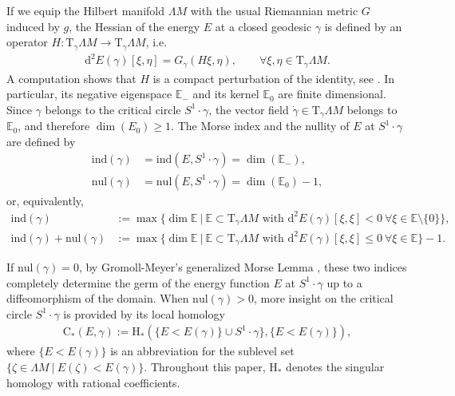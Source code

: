 \documentclass[reqno]{amsart}
\numberwithin{equation}{section}
\theoremstyle{personal}%
\theoremstyle{definition}
\newcommand{\E}{\mathds{E}}
\newcommand{\diff}{\mathrm{d}}
\newcommand{\Tan}{\mathrm{T}}
\newcommand{\Hom}{\mathrm{H}}
\newcommand{\Loc}{\mathrm{C}}
\newcommand{\ind}{\mathrm{ind}}
\newcommand{\nul}{\mathrm{nul}}
\begin{document}
If we equip the Hilbert manifold $\Lambda M$ with the usual Riemannian metric $G$ induced by $g$, the Hessian of the energy $E$ at a closed geodesic $\gamma$ is defined by an operator $H:\Tan_\gamma\Lambda M\to\Tan_\gamma\Lambda M$, i.e.
\begin{align*}
\diff^2E(\gamma)[\xi,\eta]
=
G_\gamma(H\xi,\eta),
\qquad
\forall \xi,\eta\in\Tan_\gamma\Lambda M.
\end{align*}
A computation shows that $H$ is a compact perturbation of the identity, see \cite[Lemma~3]{Gromoll:1969gh}. In particular, its negative eigenspace $\E_-$ and its kernel $\E_0$ are finite dimensional. Since $\gamma$ belongs to the critical circle $S^1\cdot\gamma$, the vector field $\dot\gamma\in\Tan_{\gamma}\Lambda M$ belongs to $\E_0$, and therefore $\dim(E_0)\geq1$. The Morse index and the nullity of $E$ at $S^1\cdot\gamma$ are defined by
\begin{align*}
\ind(\gamma) & =\ind(E,S^1\cdot\gamma)=\dim(\E_-),\\
\nul(\gamma) & =\nul(E,S^1\cdot\gamma)=\dim(\E_0)-1,
\end{align*}
or, equivalently,
\begin{align*}
\ind(\gamma) & := \max\big\{ \dim\E\ \big|\ \E\subset\Tan_\gamma\Lambda M\mbox{ with }\diff^2 E(\gamma)[\xi,\xi]<0\ \forall\xi\in\E\setminus\{0\}\big\},\\
\ind(\gamma)+\nul(\gamma) & := \max\big\{ \dim\E\ \big|\ \E\subset\Tan_\gamma\Lambda M\mbox{ with }\diff^2 E(\gamma)[\xi,\xi]\leq 0\ \forall\xi\in\E\big\}-1.
\end{align*}


If $\nul(\gamma)=0$, by Gromoll-Meyer's generalized Morse Lemma  \cite[Page~501]{Gromoll:1969gh}, these two indices completely determine the germ of the energy function $E$ at $S^1\cdot\gamma$ up to a diffeomorphism of the domain. When $\nul(\gamma)>0$, more insight on the critical circle $S^1\cdot\gamma$ is provided by its local homology
\begin{align*}
\Loc_*(E,\gamma)
:=\Hom_*(\{E<E(\gamma)\}\cup S^1\cdot\gamma\},\{E<E(\gamma)\}),
\end{align*}
where $\{E<E(\gamma)\}$ is an abbreviation for the sublevel set $\{\zeta\in\Lambda M\ |\ E(\zeta)<E(\gamma)\}$. Throughout this paper, $\Hom_*$ denotes the singular homology with rational coefficients.
\end{document}
